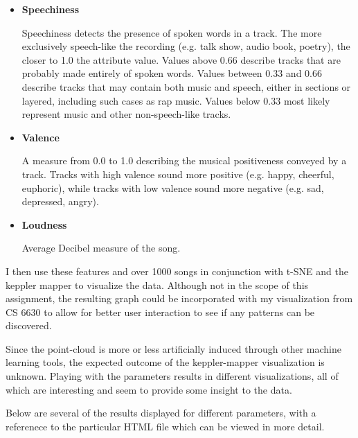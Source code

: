 \documentclass[12pt]{article}
\begin{document}
\begin{itemize}
\item \textbf{Speechiness}

Speechiness detects the presence of spoken words in a track. The more exclusively speech-like the recording (e.g. talk show, audio book, poetry), the closer to 1.0 the attribute value. Values above 0.66 describe tracks that are probably made entirely of spoken words. Values between 0.33 and 0.66 describe tracks that may contain both music and speech, either in sections or layered, including such cases as rap music. Values below 0.33 most likely represent music and other non-speech-like tracks.

\item \textbf{Valence}

A measure from 0.0 to 1.0 describing the musical positiveness conveyed by a track. Tracks with high valence sound more positive (e.g. happy, cheerful, euphoric), while tracks with low valence sound more negative (e.g. sad, depressed, angry).

\item \textbf{Loudness}

Average Decibel measure of the song.  

\end{itemize}

I then use these features and over 1000 songs in conjunction with t-SNE and the keppler mapper to visualize the data. Although not in the scope of this assignment, the resulting graph could be incorporated with my visualization from CS 6630 to allow for better user interaction to see if any patterns can be discovered. 

Since the point-cloud is more or less artificially induced through other machine learning tools, the expected outcome of the keppler-mapper visualization is unknown. Playing with the parameters results in different visualizations, all of which are interesting and seem to provide some insight to the data. 

Below are several of the results displayed for different parameters, with a referenece to the particular HTML file which can be viewed in more detail. 
\end{document}
